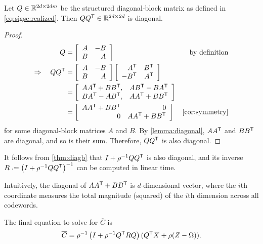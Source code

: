 \documentclass{article}
\begin{document}
\begin{theorem}
Let $Q\in\mathbb{R}^{2d\times 2dm}$ be the structured diagonal-block matrix as defined in \autoref{eq:sigsc:realized}.  Then $QQ^\mathsf{T} \in \mathbb{R}^{2d\times 2d}$ is diagonal.
\label{thm:diagb}
\end{theorem}
\begin{proof}
\begin{align*}
Q &= \left[\begin{array}{rr} A & -B\\ B & A \end{array} \right] & \text{by definition}\\
\Rightarrow \quad QQ\trans &= \left[\begin{array}{rr} A & -B\\ B & A\end{array} \right]\left[\begin{array}{rr} A\trans & B\trans\\ -B\trans & A\trans\end{array} \right]\\
&= \left[\begin{array}{rr} AA\trans  + BB\trans, & AB\trans - BA\trans\\ BA\trans - AB\trans, & AA\trans + BB\trans \end{array}\right]\\
&= \left[\begin{array}{rr} AA\trans  + BB\trans & 0 \\ 0 & AA\trans + BB\trans \end{array}\right] & \autoref{cor:symmetry}
\end{align*}
for some diagonal-block matrices $A$ and $B$. 
By \autoref{lemma:diagonal}, $AA^\mathsf{T}$ and $BB^\mathsf{T}$ are diagonal, and so is their sum.  Therefore, $QQ^\mathsf{T}$ is also diagonal.
\end{proof}
It follows from \autoref{thm:diagb} that $I + \rho^{-1}QQ^\mathsf{T}$ is also diagonal, and its inverse $R\defeq\left(I + \rho^{-1}QQ\trans\right)^{-1}$ can be computed in linear time.

Intuitively, the diagonal of $AA^\mathsf{T} + BB^\mathsf{T}$ is $d$-dimensional vector, where the $i$th coordinate measures the total magnitude (squared) of the $i$th dimension across all codewords.

The final equation to solve for $\overline{C}$ is
\begin{align}
\overline{C} = \rho^{-1}\left( I + \rho^{-1} Q^\mathsf{T} R Q\right) (Q^\mathsf{T} X + \rho(Z-\Omega)).\label{eq:cstep}
\end{align}
\end{document}
